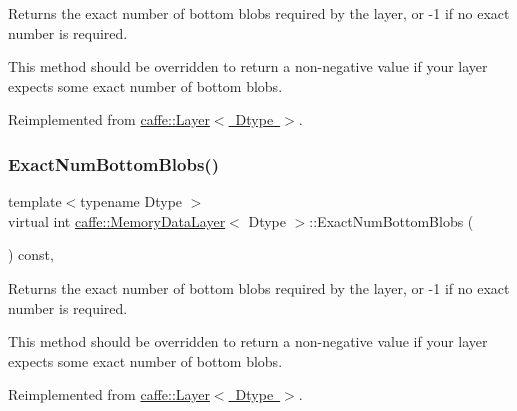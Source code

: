 Returns the exact number of bottom blobs required by the layer, or -\/1 if no exact number is required. 

This method should be overridden to return a non-\/negative value if your layer expects some exact number of bottom blobs. 

Reimplemented from \mbox{\hyperlink{classcaffe_1_1_layer_a8e5ee0494d85f5f55fc4396537cbc60f}{caffe\+::\+Layer$<$ Dtype $>$}}.

\mbox{\label{classcaffe_1_1_memory_data_layer_a05a867526de7e0c6ec4851a97f52a47b}} 
\subsubsection{\texorpdfstring{Exact\+Num\+Bottom\+Blobs()}{ExactNumBottomBlobs()}\hspace{0.1cm}{\footnotesize\ttfamily [2/2]}}
{\footnotesize\ttfamily template$<$typename Dtype $>$ \\
virtual int \mbox{\hyperlink{classcaffe_1_1_memory_data_layer}{caffe\+::\+Memory\+Data\+Layer}}$<$ Dtype $>$\+::Exact\+Num\+Bottom\+Blobs (\begin{DoxyParamCaption}{ }\end{DoxyParamCaption}) const\hspace{0.3cm}{\ttfamily [inline]}, {\ttfamily [virtual]}}



Returns the exact number of bottom blobs required by the layer, or -\/1 if no exact number is required. 

This method should be overridden to return a non-\/negative value if your layer expects some exact number of bottom blobs. 

Reimplemented from \mbox{\hyperlink{classcaffe_1_1_layer_a8e5ee0494d85f5f55fc4396537cbc60f}{caffe\+::\+Layer$<$ Dtype $>$}}.

\mbox{\label{classcaffe_1_1_memory_data_layer_af714b4cbc022be1592ad26c300b63ae4}} 
